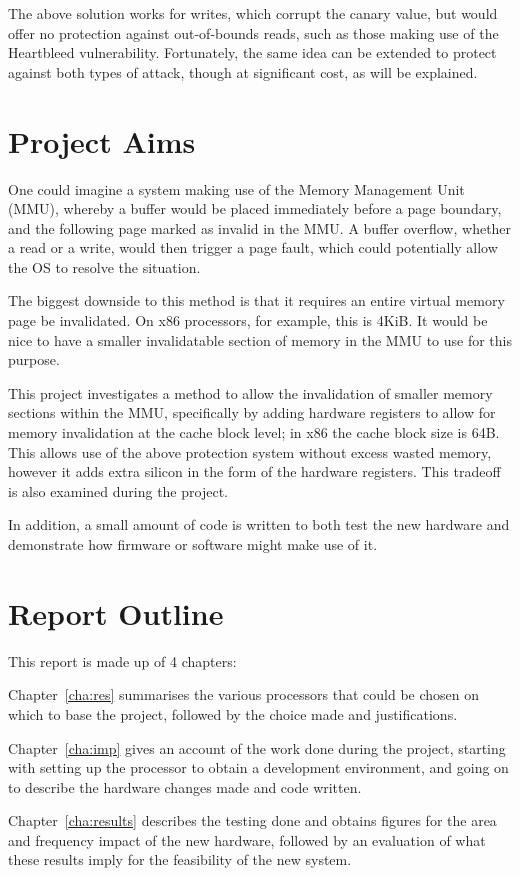 The above solution works for writes, which corrupt the canary value, but would offer no protection against out-of-bounds reads, such as those making use of the Heartbleed vulnerability. Fortunately, the same idea can be extended to protect against both types of attack, though at significant cost, as will be explained.

\section{Project Aims}
One could imagine a system making use of the Memory Management Unit (MMU), whereby a buffer would be placed immediately before a page boundary, and the following page marked as invalid in the MMU. A buffer overflow, whether a read or a write, would then trigger a page fault, which could potentially allow the OS to resolve the situation.

The biggest downside to this method is that it requires an entire virtual memory page be invalidated. On x86 processors, for example, this is 4KiB. It would be nice to have a smaller invalidatable section of memory in the MMU to use for this purpose.

This project investigates a method to allow the invalidation of smaller memory sections within the MMU, specifically by adding hardware registers to allow for memory invalidation at the cache block level; in x86 the cache block size is 64B. This allows use of the above protection system without excess wasted memory, however it adds extra silicon in the form of the hardware registers. This tradeoff is also examined during the project.

In addition, a small amount of code is written to both test the new hardware and demonstrate how firmware or software might make use of it.

\section{Report Outline}
This report is made up of 4 chapters:

Chapter~\ref{cha:res} summarises the various processors that could be chosen on which to base the project, followed by the choice made and justifications.

Chapter~\ref{cha:imp} gives an account of the work done during the project, starting with setting up the processor to obtain a development environment, and going on to describe the hardware changes made and code written.

Chapter~\ref{cha:results} describes the testing done and obtains figures for the area and frequency impact of the new hardware, followed by an evaluation of what these results imply for the feasibility of the new system.